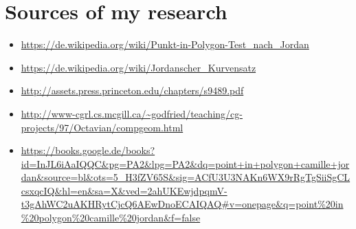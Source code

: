 \documentclass[12pt,a4paper]{scrreprt}
\begin{document}
\chapter{Sources of my research}
\begin{flushleft}
\vspace{0.1cm}
\begin{itemize}
\item \url{https://de.wikipedia.org/wiki/Punkt-in-Polygon-Test_nach_Jordan}
\item \url{https://de.wikipedia.org/wiki/Jordanscher_Kurvensatz}
\item \url{http://assets.press.princeton.edu/chapters/s9489.pdf}
\item \url{http://www-cgrl.cs.mcgill.ca/~godfried/teaching/cg-projects/97/Octavian/compgeom.html}
\item \url{https://books.google.de/books?id=InJL6iAaIQQC&pg=PA2&lpg=PA2&dq=point+in+polygon+camille+jordan&source=bl&ots=5_H3fZV65S&sig=ACfU3U3NAKn6WX9rRgTgSiiSgCLcsxqcIQ&hl=en&sa=X&ved=2ahUKEwjdpqmV-t3gAhWC2uAKHRytCjcQ6AEwDnoECAIQAQ#v=onepage&q=point\%20in\%20polygon\%20camille%20jordan&f=false}
\end{itemize}
\vspace{0.1cm}





\end{flushleft}
\end{document}
